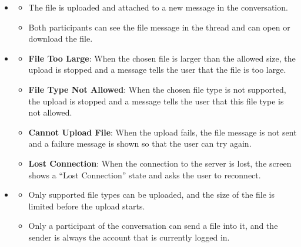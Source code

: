 \begin{itemize}[leftmargin=1.6em,topsep=4pt,itemsep=3pt,parsep=0pt,label=$\bullet$]
        \begin{itemize}[leftmargin=2.2em,topsep=2pt,itemsep=3pt,parsep=0pt,label=$\circ$]
            \item \textbf{Cancel the File Chooser}: When the user closes the file chooser without choosing a file, no upload is started and nothing changes.
            \item \textbf{Image Preview}: When the chosen file is an image, the picture is rendered directly inside the message bubble instead of a download card.
        \end{itemize}
    \item {}

        \begin{itemize}[leftmargin=2.2em,topsep=2pt,itemsep=3pt,parsep=0pt,label=$\circ$]
            \item The file is uploaded and attached to a new message in the conversation.
            \item Both participants can see the file message in the thread and can open or download the file.
        \end{itemize}
    \item {}

        \begin{itemize}[leftmargin=2.2em,topsep=2pt,itemsep=3pt,parsep=0pt,label=$\circ$]
            \item \textbf{File Too Large}: When the chosen file is larger than the allowed size, the upload is stopped and a message tells the user that the file is too large.
            \item \textbf{File Type Not Allowed}: When the chosen file type is not supported, the upload is stopped and a message tells the user that this file type is not allowed.
            \item \textbf{Cannot Upload File}: When the upload fails, the file message is not sent and a failure message is shown so that the user can try again.
            \item \textbf{Lost Connection}: When the connection to the server is lost, the screen shows a ``Lost Connection'' state and asks the user to reconnect.
        \end{itemize}
    \item {}

        \begin{itemize}[leftmargin=2.2em,topsep=2pt,itemsep=3pt,parsep=0pt,label=$\circ$]
            \item Only supported file types can be uploaded, and the size of the file is limited before the upload starts.
            \item Only a participant of the conversation can send a file into it, and the sender is always the account that is currently logged in.
        \end{itemize}
\end{itemize}

